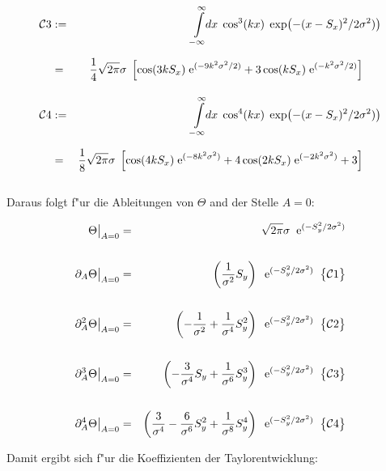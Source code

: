 \begin{small}
\begin{eqnarray*}
{\cal C}3 &:=&\int\limits_{-\infty}^{\infty}\!\!dx\;\cos^3(kx)\;\exp\!\left(-(x-S_x)^2/2\sigma^2)\right)\\
&=&\frac{1}{4}\sqrt{2\pi}\sigma\;\left[\cos(3kS_x)\;{\rm e}^{(-9k^2\sigma^2/2)}+3\cos(kS_x)\;{\rm e}^{(-k^2\sigma^2/2)}\right]\phantom{\int\limits_{-\infty}^{\infty}}\\
{\cal C} 4 &:=&\int\limits_{-\infty}^{\infty}\!\!dx\;\cos^4(kx)\;\exp\!\left(-(x-S_x)^2/2\sigma^2)\right)\\
&=&\frac{1}{8}\sqrt{2\pi}\sigma\;\left[\cos(4kS_x)\;{\rm e}^{(-8k^2\sigma^2)}+4\cos(2kS_x)\;{\rm e}^{(-2k^2\sigma^2)}+3\right]\phantom{\int\limits_{-\infty}^{\infty}}
\end{eqnarray*}
\end{small}

\noindent Daraus folgt f"ur die Ableitungen von $\Theta$ and der Stelle $A=0$:

\begin{small}
\begin{eqnarray*}
\Theta\big\vert_{A=0} &=& \sqrt{2\pi}\sigma\;\;{\rm e}^{(-S_y^2/2\sigma^2)}\\
&&\\
{\partial_A}
\Theta\big\vert_{A=0}&=&\left(\frac{1}{\sigma^2}S_y\right)\;\;{\rm e}^{(-S_y^2/2\sigma^2)}\;\;{\big\{}{\cal C}1{\big\}}\\
&&\\
{\partial^2_A}
\Theta\big\vert_{A=0}&=&\left(-\frac{1}{\sigma^2}+\frac{1}{\sigma^4}S_y^2\right)\;\;{\rm e}^{(-S_y^2/2\sigma^2)}\;\;{\big\{}{\cal C}2{\big\}}\\
&&\\
{\partial^3_A}
\Theta\big\vert_{A=0}&=&\left(-\frac{3}{\sigma^4}S_y+\frac{1}{\sigma^6}S_y^3\right)\;\;{\rm e}^{(-S_y^2/2\sigma^2)}\;\;{\big\{}{\cal C}3{\big\}}\\
&&\\
{\partial^4_A} 
\Theta\big\vert_{A=0}&=&\left(\frac{3}{\sigma^4}-\frac{6}{\sigma^6}S_y^2+\frac{1}{\sigma^8}S_y^4\right)\;\;{\rm e}^{(-S_y^2/2\sigma^2)}\;\;{\big\{}{\cal C}4{\big\}}\\
\end{eqnarray*}
\end{small}

\noindent Damit ergibt sich f"ur die Koeffizienten der Taylorentwicklung:

